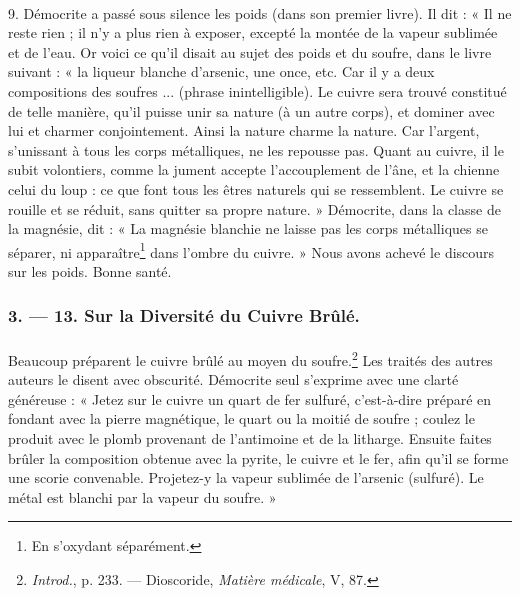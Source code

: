 \documentclass[a4paper, 11pt, oneside, polutonikogreek, french]{article}
\begin{document}
\paragraph{}
9. Démocrite a passé sous silence les poids (dans son premier livre). Il dit : « Il ne reste rien ; il n'y a plus rien à exposer, excepté la montée de la vapeur sublimée et de l'eau. Or voici ce qu'il disait au sujet des poids et du soufre, dans le livre suivant : « la liqueur blanche d'arsenic, une once, etc. Car il y a deux compositions des soufres ... (phrase inintelligible). Le cuivre sera trouvé constitué de telle manière, qu'il puisse unir sa nature (à un autre corps), et dominer avec lui et charmer conjointement. Ainsi la nature charme la nature. Car l'argent, s'unissant à tous les corps métalliques, ne les repousse pas. Quant au cuivre, il le subit volontiers, comme la jument accepte l'accouplement de l'âne, et la chienne celui du loup : ce que font tous les êtres naturels qui se ressemblent. Le cuivre se rouille et se réduit, sans quitter sa propre nature. » Démocrite, dans la classe de la magnésie, dit : « La magnésie blanchie ne laisse pas les corps métalliques se séparer, ni apparaître\footnote{En s'oxydant séparément.} dans l'ombre du cuivre. » Nous avons achevé le discours sur les poids. Bonne santé.

\bigskip
\centerline{\EightStarTaper}
\centerline{\EightStarTaper\EightStarTaper}
\bigskip

\subsubsection{3. --- 13. Sur la Diversité du Cuivre Brûlé.}
\paragraph{}
Beaucoup préparent le cuivre brûlé au moyen du soufre.\footnote{\emph{Introd.}, p. 233. --- Dioscoride, \emph{Matière médicale}, V, 87.} Les traités des autres auteurs le disent avec obscurité. Démocrite seul s'exprime avec une clarté généreuse : « Jetez sur le cuivre un quart de fer sulfuré, c'est-à-dire préparé en fondant avec la pierre magnétique, le quart ou la moitié de soufre ; coulez le produit avec le plomb provenant de l'antimoine et de la litharge. Ensuite faites brûler la composition obtenue avec la pyrite, le cuivre et le fer, afin qu'il se forme une scorie convenable. Projetez-y la vapeur sublimée de l'arsenic (sulfuré). Le métal est blanchi par la vapeur du soufre. »
\end{document}
